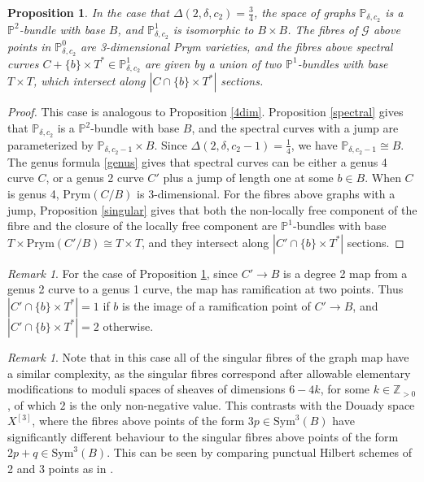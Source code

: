 \documentclass{article}[12pt]
\newtheorem{proposition}[theorem]{Proposition}
\theoremstyle{definition}
\theoremstyle{remark}
\newtheorem{remark}[theorem]{Remark}
\newcommand \Z{\mathbb Z}
\numberwithin{equation}{section}
\newcommand \mc{\mathcal}
\newcommand \mb{\mathbb}
\begin{document}
\begin{proposition}\label{6dim}
	In the case that $\Delta(2,\delta,c_2)=\frac{3}{4}$, the space of graphs $\mb{P}_{\delta,c_2}$ is a $\mb{P}^2$-bundle with base $B$, and $\mb{P}^1_{\delta,c_2}$ is isomorphic to $B\times B$. The fibres of $\mc{G}$ above points in $\mb{P}_{\delta,c_2}^0$ are 3-dimensional Prym varieties, and the fibres above spectral curves $C+\{b\}\times T^* \in \mb{P}^1_{\delta,c_2}$ are given by a union of two $\mb{P}^1$-bundles with base $T\times T$, which intersect along $|C\cap \{b\}\times T^*|$ sections.
\end{proposition}
\begin{proof}
	This case is analogous to Proposition \ref{4dim}. Proposition \ref{spectral} gives that $\mb{P}_{\delta,c_2}$ is a $\mb{P}^2$-bundle with base $B$, and the spectral curves with a jump are parameterized by $\mb{P}_{\delta,c_2-1}\times B$. Since $\Delta(2,\delta,c_2-1)=\frac{1}{4}$, we have $\mb{P}_{\delta, c_2-1}\cong B$. The genus formula \eqref{genus} gives that spectral curves can be either a genus 4 curve $C$, or a genus 2 curve $C'$ plus a jump of length one at some $b \in B$. When $C$ is genus 4, $\text{Prym}(C/B)$ is 3-dimensional. For the fibres above graphs with a jump, Proposition \ref{singular} gives that both the non-locally free component of the fibre and the closure of the locally free component are $\mb{P}^1$-bundles with base $T\times \text{Prym}(C'/B)\cong T\times T$, and they intersect along $|C'\cap \{b\}\times T^*|$ sections. 
\end{proof}
\begin{remark}
	For the case of Proposition \ref{6dim}, since $C'\to B$ is a degree 2 map from a genus 2 curve to a genus 1 curve, the map has ramification at two points. Thus $|C'\cap \{b\}\times T^*|=1$ if $b$ is the image of a ramification point of $C'\to B$, and $|C'\cap \{b\}\times T^*|=2$ otherwise.
\end{remark}

\begin{remark}
Note that in this case all of the singular fibres of the graph map have a similar complexity, as the singular fibres correspond after allowable elementary modifications to moduli spaces of sheaves of dimensions $6-4k$, for some $k\in \Z_{>0}$, of which $2$ is the only non-negative value. This contrasts with the Douady space $X^{[3]}$, where the fibres above points of the form $3p \in \text{Sym}^3(B)$ have significantly different behaviour to the singular fibres above points of the form $2p+q \in \text{Sym}^3(B)$. This can be seen by comparing punctual Hilbert schemes of 2 and 3 points as in \cite{Briancon}.
\end{remark}
\end{document}
